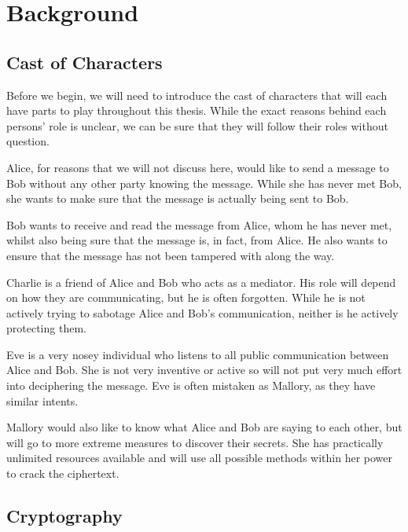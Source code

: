 %
%
\graphicspath{{./chapters/chapter02/fig02/}}

\let\textcircled=\pgftextcircled
\chapter{Background}
\label{chap:background}

\section{Cast of Characters}

Before we begin, we will need to introduce the cast of characters that will each have parts to play throughout this thesis. While the exact reasons behind each persons' role is unclear, we can be sure that they will follow their roles without question. 

{\large\color{bristol-red}Alice}, for reasons that we will not discuss here, would like to send a message to Bob without any other party knowing the message. While she has never met Bob, she wants to make sure that the message is actually being sent to Bob.

{\large\color{bristol-red}Bob} wants to receive and read the message from Alice, whom he has never met, whilst also being sure that the message is, in fact, from Alice. He also wants to ensure that the message has not been tampered with along the way.

{\large\color{bristol-red}Charlie} is a friend of Alice and Bob who acts as a mediator. His role will depend on how they are communicating, but he is often forgotten. While he is not actively trying to sabotage Alice and Bob's communication, neither is he actively protecting them.

{\large\color{bristol-red}Eve} is a very nosey individual who listens to all public communication between Alice and Bob. She is not very inventive or active so will not put very much effort into deciphering the message. Eve is often mistaken as Mallory, as they have similar intents.

{\large\color{bristol-red}Mallory} would also like to know what Alice and Bob are saying to each other, but will go to more extreme measures to discover their secrets. She has practically unlimited resources available and will use all possible methods within her power to crack the ciphertext. 

\section{Cryptography}
\label{sec1:crypto}

